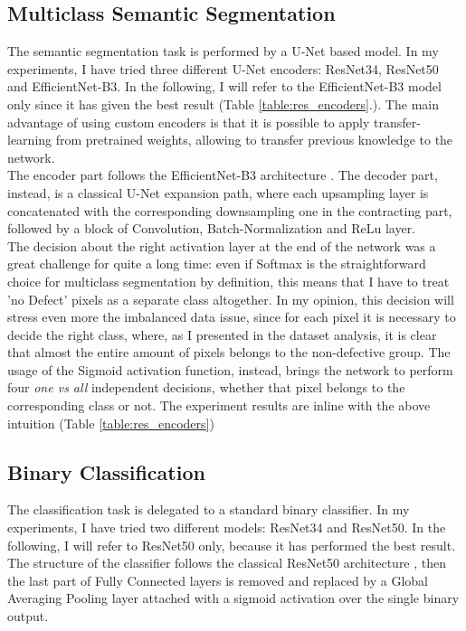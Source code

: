 \documentclass[10pt,twocolumn,letterpaper]{article}
\begin{document}
   \subsection{Multiclass Semantic Segmentation}
   The semantic segmentation task is performed by a U-Net based model. In my experiments, I have tried three different U-Net encoders: ResNet34, ResNet50 and EfficientNet-B3. In the following, I will refer to the EfficientNet-B3 model only since it has given the best result (Table \ref{table:res_encoders}.).
   The main advantage of using custom encoders is that it is possible to apply transfer-learning from pretrained weights, allowing to transfer previous knowledge to the network. \\
   The encoder part follows the EfficientNet-B3 architecture \cite{efficientnet}. The decoder part, instead, is a classical U-Net expansion path, where each upsampling layer is concatenated with the corresponding downsampling one in the contracting part, followed by a block of Convolution, Batch-Normalization and ReLu layer. \\
   The decision about the right activation layer at the end of the network was a great challenge for quite a long time: even if Softmax is the straightforward choice for multiclass segmentation by definition, this means that I have to treat 'no Defect' pixels as a separate class altogether. In my opinion, this decision will stress even more the imbalanced data issue, since for each pixel it is necessary to decide the right class, where, as I presented in the dataset analysis, it is clear that almost the entire amount of pixels belongs to the non-defective group. The usage of the Sigmoid activation function, instead, brings the network to perform four \textit{one vs all} independent decisions, whether that pixel belongs to the corresponding class or not. The experiment results are inline with the above intuition (Table \ref{table:res_encoders})

   \subsection{Binary Classification}
   The classification task is delegated to a standard binary classifier. In my experiments, I have tried two different models: ResNet34 and ResNet50. In the following, I will refer to ResNet50 only, because it has performed the best result.
   The structure of the classifier follows the classical ResNet50 architecture \cite{resnet}, then the last part of Fully Connected layers is removed and replaced by a Global Averaging Pooling layer attached with a sigmoid activation over the single binary output.
\end{document}
